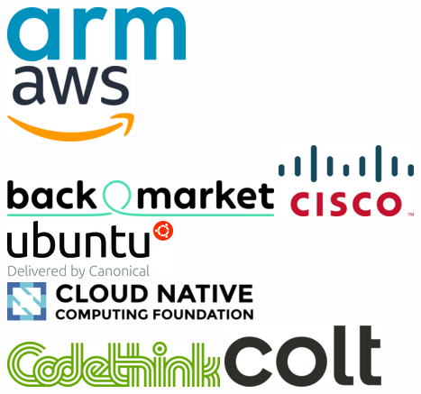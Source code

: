 \documentclass[aspectratio=169]{beamer}
\begin{document}
\begin{frame}
	\begin{columns}[t]
	\centering
		\includegraphics[scale=0.5]{images/arm.png}\\
		\includegraphics[scale=0.5]{images/aws.png}\\
		\includegraphics[scale=0.3]{images/backmarket.png}
	\centering
		\includegraphics[scale=0.5]{images/cisco.png}\\
		\includegraphics[scale=0.5]{images/canonical.png}\\
		\includegraphics[scale=0.4]{images/cncf.png}\\
		\includegraphics[scale=0.5]{images/codethink.png}
	\centering
		\includegraphics[scale=0.2]{images/colt.png}\\

\end{columns}
\end{frame}
\end{document}

